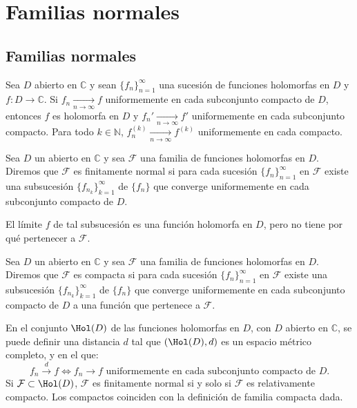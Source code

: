 \chapter{Familias normales}

\section{Familias normales}
\begin{theorem}
    Sea $D$ abierto en $\mathbb{C}$ y sean $\{f_n\}_{n=1}^\infty$ una sucesión de funciones holomorfas en $D$ y $f: D \to \mathbb{C}$.
    Si $f_n \xrightarrow[n \to \infty]{} f$ uniformemente en cada subconjunto compacto de $D$, entonces $f$ es holomorfa en $D$ y $f_n' \xrightarrow[n \to \infty]{} f'$ uniformemente en cada subconjunto compacto.
    Para todo $k \in \mathbb{N}$, $f^{(k)}_n \xrightarrow[n \to \infty]{} f^{(k)}$ uniformemente en cada compacto.
\end{theorem}

\begin{definition}
    Sea $D$ un abierto en $\mathbb{C}$ y sea $\mathcal{F}$ una familia de funciones holomorfas en $D$.
    Diremos que $\mathcal{F}$ es finitamente normal si para cada sucesión $\{f_n\}_{n=1}^\infty$ en $\mathcal{F}$ existe una subsucesión $\{f_{n_k}\}_{k=1}^\infty$ de $\{f_n\}$ que converge uniformemente en cada subconjunto compacto de $D$.
\end{definition}

\begin{remark}
    El límite $f$ de tal subsucesión es una función holomorfa en $D$, pero no tiene por qué pertenecer a $\mathcal{F}$.
\end{remark}

\begin{definition}
    Sea $D$ un abierto en $\mathbb{C}$ y sea $\mathcal{F}$ una familia de funciones holomorfas en $D$.
    Diremos que $\mathcal{F}$ es compacta si para cada sucesión $\{f_n\}_{n=1}^\infty$ en $\mathcal{F}$ existe una subsucesión $\{f_{n_k}\}_{k=1}^\infty$ de $\{f_n\}$ que converge uniformemente en cada subconjunto compacto de $D$ a una función que pertenece a $\mathcal{F}$.
\end{definition}

En el conjunto $\Hol(D)$ de las funciones holomorfas en $D$, con $D$ abierto en $\mathbb{C}$, se puede definir una distancia $d$ tal que $(\Hol(D), d)$ es un espacio métrico completo, y en el que:
$$f_n \xrightarrow{d} f \Leftrightarrow f_n \to f \text{ uniformemente en cada subconjunto compacto de } D.$$
Si $\mathcal{F} \subset \Hol(D)$, $\mathcal{F}$ es finitamente normal si y solo si $\mathcal{F}$ es relativamente compacto.
Los compactos coinciden con la definición de familia compacta dada.

